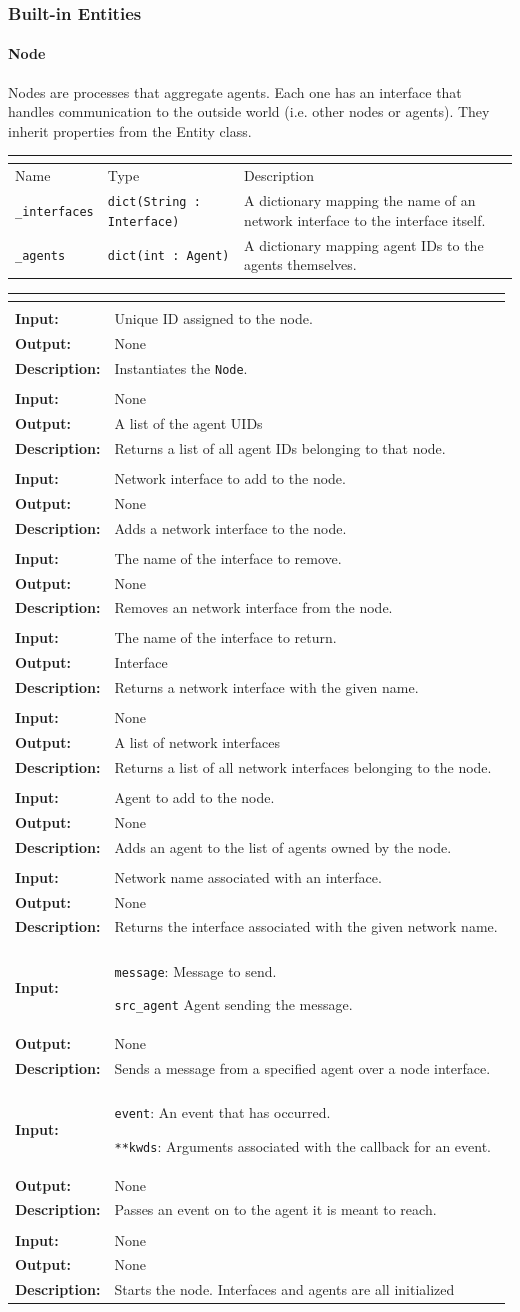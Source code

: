 \documentclass[titlepage]{article}
\renewenvironment{itemize*}
    {\begin{itemize}
        \setlength{\itemsep}{0pt}%
        \setlength{\parskip}{0pt}%
        \setlength{\partopsep}{0pt}%
        \setlength{\topsep}{0pt}}%
    {\end{itemize}}
\newcommand{\operations}[1]{
\begin{center}
    \begin{longtable}{|p{4cm}|p{10cm + 2.0\tabcolsep}|}
    \hline
    \multicolumn{2}{|l|}{\cellcolor[gray]{0.5}{\textbf{Operations}}} \\ \hline
#1
    \end{longtable}
\end{center}
}
\newcommand{\operation}[4]{
    \hline
    \multicolumn{2}{|l|}{\cellcolor[gray]{0.8}{\texttt{#1}}} \\ \hline
    \hspace{7pt}\textbf{Input:} & #2 \\ \hline
    \hspace{7pt}\textbf{Output:} & #3 \\ \hline
    \hspace{7pt}\textbf{Description:} & #4 \\ \hline
}
\newcommand{\attributes}[1]{
    \begin{center}
        \begin{tabular}{|p{3.5cm}|p{3.5cm}|p{7cm}|}
            \multicolumn{3}{|l|}{\cellcolor[gray]{0.5}{\textbf{Attributes}}} \\ \hline
            \rowcolor[gray]{0.8} Name & Type & Description \\ \hline 
            #1
        \end{tabular}
    \end{center}
}
\newcommand{\attribute}[3]{
    \texttt{#1} & \texttt{#2} & #3 \\ \hline
}
\begin{document}
\subsubsection{Built-in Entities}
\paragraph{Node}{Nodes are processes that aggregate agents. Each one has an interface that handles communication to the outside world (i.e. other nodes or agents). They inherit properties from the Entity class.}

\attributes{
    \attribute{\_interfaces}{dict(String : Interface)}{A dictionary mapping the name of an network interface to the interface itself. }
    \attribute{\_agents}{dict(int : Agent)}{A dictionary mapping agent IDs to the agents themselves.}
}

\operations{
    \operation{\_\_init\_\_(uid)}{Unique ID assigned to the node.}{None}{Instantiates the \texttt{Node}.}
    \operation{get\_agent\_uids()}{None}{A list of the agent UIDs}{Returns a list of all agent IDs belonging to that node.}
    \operation{add\_interface(interface)}{Network interface to add to the node.}{None}{Adds a network interface to the node.}
    \operation{remove\_interface(name)}{The name of the interface to remove.}{None}{Removes an network interface from the node.}
    \operation{get\_interface(name)}{The name of the interface to return.}{Interface}{Returns a network interface with the given name.}
    \operation{get\_interfaces()}{None}{A list of network interfaces}{Returns a list of all network interfaces belonging to the node.}
    \operation{add\_agent(agent\_inst)}{Agent to add to the node.}{None}{Adds an agent to the list of agents owned by the node.}
    \operation{get\_interface\_on\_net(network\_name)}{Network name associated with an interface.}{None}{Returns the interface associated with the given network name.}
    \operation{send(message,src\_agent)}
    {
        \begin{itemize*}
            \item \texttt{message}: Message to send. 
            \item \texttt{src\_agent} Agent sending the message.
        \end{itemize*}
    }{None}{Sends a message from a specified agent over a node interface.}
    \operation{\_on\_message(event,**kwds)}
    {
        \begin{itemize*}
            \item \texttt{event}: An event that has occurred. 
            \item \texttt{**kwds}: Arguments associated with the callback for an event.
        \end{itemize*}
    }{None}{Passes an event on to the agent it is meant to reach.}
    \operation{run()}{None}{None}{Starts the node. Interfaces and agents are all initialized}
}
\end{document}
